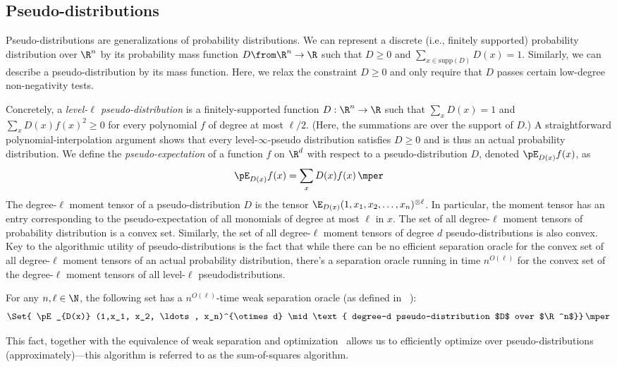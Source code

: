 \subsection{Pseudo-distributions}

Pseudo-distributions are generalizations of probability distributions.
We can represent a discrete (i.e., finitely supported) probability distribution over $\R^n$ by its probability mass function $D\from \R^n \to \R$ such that $D \geq 0$ and $\sum_{x \in \mathrm{supp}(D)} D(x) = 1$.
Similarly, we can describe a pseudo-distribution by its mass function.
Here, we relax the constraint $D\ge 0$ and only require that $D$ passes certain low-degree non-negativity tests.

Concretely, a \emph{level-$\ell$ pseudo-distribution} is a finitely-supported function $D:\R^n \rightarrow \R$ such that $\sum_{x} D(x) = 1$ and $\sum_{x} D(x) f(x)^2 \geq 0$ for every polynomial $f$ of degree at most $\ell/2$.
(Here, the summations are over the support of $D$.)
A straightforward polynomial-interpolation argument shows that every level-$\infty$-pseudo distribution satisfies $D\ge 0$ and is thus an actual probability distribution.
We define the \emph{pseudo-expectation} of a function $f$ on $\R^d$ with respect to a pseudo-distribution $D$, denoted $\pE_{D(x)} f(x)$, as
\begin{equation}
  \pE_{D(x)} f(x) = \sum_{x} D(x) f(x) \,\mper
\end{equation}
The degree-$\ell$ moment tensor of a pseudo-distribution $D$ is the tensor $\E_{D(x)} (1,x_1, x_2,\ldots, x_n)^{\otimes \ell}$.
In particular, the moment tensor has an entry corresponding to the pseudo-expectation of all monomials of degree at most $\ell$ in $x$.
The set of all degree-$\ell$ moment tensors of probability distribution is a convex set.
Similarly, the set of all degree-$\ell$ moment tensors of degree $d$ pseudo-distributions is also convex.
Key to the algorithmic utility of pseudo-distributions is the fact that while there can be no efficient separation oracle for the convex set of all degree-$\ell$ moment tensors of an actual probability distribution, there's a separation oracle running in time $n^{O(\ell)}$ for the convex set of the degree-$\ell$ moment tensors of all level-$\ell$ pseudodistributions.

\begin{fact}
  \label{fact:sos-separation-efficient}
  For any $n,\ell \in \N$, the following set has a $n^{O(\ell)}$-time weak separation oracle (as defined in ~\citet{MR625550-Grotschel81}):
  \begin{equation}
    \Set{ \pE_{D(x)} (1,x_1, x_2, \ldots, x_n)^{\otimes d} \mid \text{ degree-d pseudo-distribution $D$ over $\R^n$}}\,\mper
  \end{equation}
\end{fact}
This fact, together with the equivalence of weak separation and optimization~\citep{MR625550-Grotschel81} allows us to efficiently optimize over pseudo-distributions (approximately)---this algorithm is referred to as the sum-of-squares algorithm.

